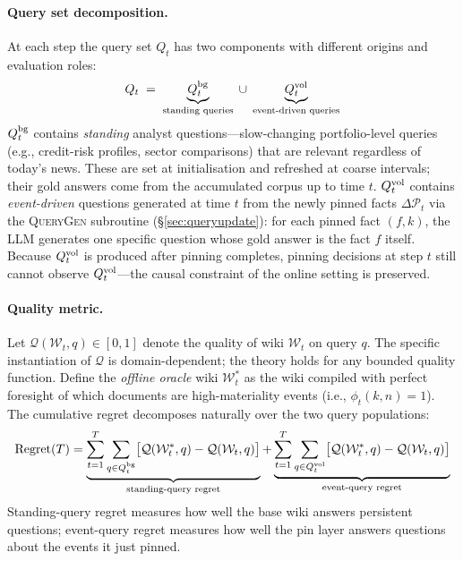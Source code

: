 \documentclass{article}
\newcommand{\wt}{\mathcal{W}_t}
\begin{document}
\paragraph{Query set decomposition.}
At each step the query set $Q_t$ has two components with different origins and evaluation roles:
\begin{equation}
  Q_t \;=\; \underbrace{Q_t^{\textup{bg}}}_{\text{standing queries}} \;\cup\; \underbrace{Q_t^{\textup{vol}}}_{\text{event-driven queries}}
  \label{eq:qt_def}
\end{equation}
$Q_t^{\textup{bg}}$ contains \emph{standing} analyst questions---slow-changing portfolio-level queries (e.g., credit-risk profiles, sector comparisons) that are relevant regardless of today's news.
These are set at initialisation and refreshed at coarse intervals; their gold answers come from the accumulated corpus up to time $t$.
$Q_t^{\textup{vol}}$ contains \emph{event-driven} questions generated at time $t$ from the newly pinned facts $\Delta\mathcal{P}_t$ via the \textsc{QueryGen} subroutine (\S\ref{sec:queryupdate}): for each pinned fact $(f,k)$, the LLM generates one specific question whose gold answer is the fact $f$ itself.
Because $Q_t^{\textup{vol}}$ is produced after pinning completes, pinning decisions at step $t$ still cannot observe $Q_t^{\textup{vol}}$---the causal constraint of the online setting is preserved.

\paragraph{Quality metric.}
Let $\mathcal{Q}(\wt, q) \in [0,1]$ denote the quality of wiki $\wt$ on query $q$.
The specific instantiation of $\mathcal{Q}$ is domain-dependent; the theory holds for any bounded quality function.
Define the \emph{offline oracle} wiki $\wt^*$ as the wiki compiled with perfect foresight of which documents are high-materiality events (i.e., $\phi_t(k,n) = 1$).
The cumulative regret decomposes naturally over the two query populations:
\begin{equation}
  \text{Regret}(T) = \underbrace{\sum_{t=1}^{T} \sum_{q \in Q_t^{\textup{bg}}} \bigl[\mathcal{Q}(\wt^*, q) - \mathcal{Q}(\wt, q)\bigr]}_{\text{standing-query regret}} + \underbrace{\sum_{t=1}^{T} \sum_{q \in Q_t^{\textup{vol}}} \bigl[\mathcal{Q}(\wt^*, q) - \mathcal{Q}(\wt, q)\bigr]}_{\text{event-query regret}}
  \label{eq:regret}
\end{equation}
Standing-query regret measures how well the base wiki answers persistent questions; event-query regret measures how well the pin layer answers questions about the events it just pinned.
\end{document}

